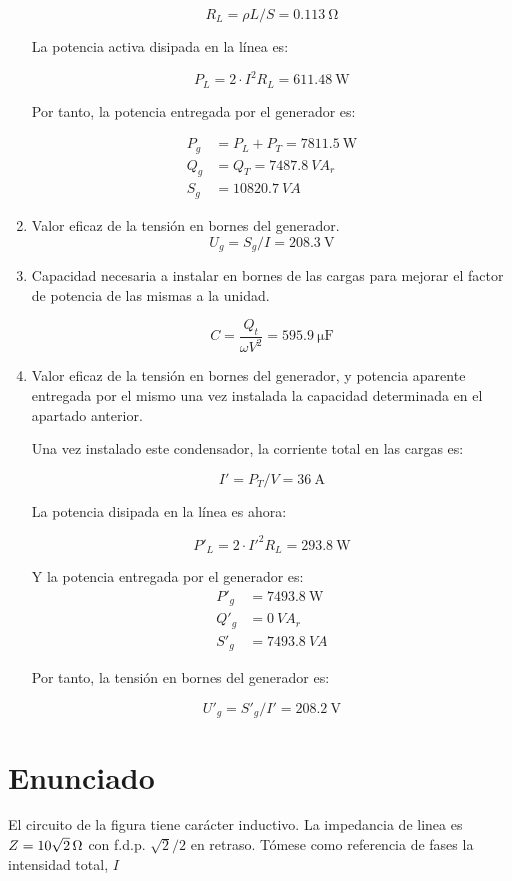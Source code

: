 \begin{enumerate}
\[
R_L = \rho L/S = \qty{0.113}{\ohm}
\]

La potencia activa disipada en la línea es:

\[
P_L = 2 \cdot I^2 R_L = \qty{611.48}{\watt}
\]

Por tanto, la potencia entregada por el generador es:

\begin{align*}
P_g &= P_L + P_T = \qty{7811.5}{\watt}\\
Q_g &= Q_T = \qty{7487.8}{VA}_r\\
S_g &= \qty{10820.7}{VA}
\end{align*}

\item Valor eficaz de la tensión en bornes del generador.
\[
U_g = S_g / I = \qty{208.3}{\volt}
\]

\item Capacidad necesaria a instalar en bornes de las cargas para
  mejorar el factor de potencia de las mismas a la unidad.

  \[
C = \frac{Q_t}{\omega V^2} = \qty{595.9}{\micro\farad}
\]


\item Valor eficaz de la tensión en bornes del generador, y potencia
  aparente entregada por el mismo una vez instalada la capacidad
  determinada en el apartado anterior.

  Una vez instalado este condensador, la corriente total en las cargas es:

\[
I' = P_T / V = \qty{36}{\ampere}
\]

La potencia disipada en la línea es ahora:

\[
P'_L = 2 \cdot I'^2 R_L = \qty{293.8}{\watt} 
\]

Y la potencia entregada por el generador es:
\begin{align*}
P'_g &= \qty{7493.8}{\watt}\\
Q'_g &= \qty{0}{VA}_r\\
S'_g &= \qty{7493.8}{VA}
\end{align*}

Por tanto, la tensión en bornes del generador es:

\[
U'_g = S'_g / I' = \qty{208.2}{\volt}
\]

\end{enumerate}

\section{Enunciado}
El circuito de la figura tiene carácter inductivo.  La impedancia de
linea es $Z=\qty[parse-numbers=false]{10\sqrt{2}}{\ohm}$ con
f.d.p. $\sqrt{2}/2$ en retraso. Tómese como referencia de fases la
intensidad total, $I$

